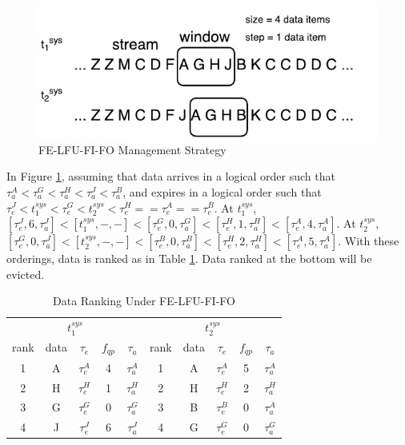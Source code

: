 \begin{figure}[!htbp]
	\centering
    \includegraphics[width=5in]{img/3-sifelfufifo.pdf}
    \caption{FE-LFU-FI-FO Management Strategy}
    \label{fig:3-sifelfufifo}
\end{figure}

In Figure \ref{fig:3-sifelfufifo}, assuming that data arrives in a logical order such that $\tau^{A}_{a} < \tau^{G}_{a} < \tau^{H}_{a} < \tau^{J}_{a} < \tau^{B}_{a}$, and expires in a logical order such that  $\tau^{J}_{e} < t^{sys}_{1} < \tau^{G}_{e} < t^{sys}_{2} < \tau^{H}_{e} == \tau^{A}_{e} == \tau^{B}_{e}$.
At $t^{sys}_{1}$, $[\tau^{J}_{e}, 6, \tau^{J}_{a}] < [t^{sys}_{1}, -, -] < [\tau^{G}_{e}, 0, \tau^{G}_{a}] < [\tau^{H}_{e}, 1, \tau^{H}_{a}] < [\tau^{A}_{e}, 4, \tau^{A}_{a}]$. 
At $t^{sys}_{2}$, $[\tau^{G}_{e}, 0, \tau^{J}_{a}] < [t^{sys}_{2}, -, -] < [\tau^{B}_{e}, 0, \tau^{B}_{a}] < [\tau^{H}_{e}, 2, \tau^{H}_{a}] < [\tau^{A}_{e}, 5, \tau^{A}_{a}]$. 
With these orderings, data is ranked as in Table \ref{tab:felfufifo}. 
Data ranked at the bottom will be evicted. 

\begin{table}[!htbp]
\centering
\caption{Data Ranking Under FE-LFU-FI-FO}
\label{tab:felfufifo}
\begin{tabular}{|c|c|c|c|c||c|c|c|c|c|}
\hline
\multicolumn{5}{|c||}{$t^{sys}_{1}$} & \multicolumn{5}{c|}{$t^{sys}_{2}$} \\ \hhline{|=====#=====|}
rank & data & $\tau_{e}$ & $f_{qp}$ & $\tau_{a}$ & rank & data & $\tau_{e}$ & $f_{qp}$ & $\tau_{a}$ \\ \hhline{|=|=|=|=|=#=|=|=|=|=|}
1 & A & $\tau^{A}_{e}$ & 4 & $\tau^{A}_{a}$ & 1 & A & $\tau^{A}_{e}$ & 5 & $\tau^{A}_{a}$ \\ \hline
2 & H & $\tau^{H}_{e}$ & 1 & $\tau^{H}_{a}$ & 2 & H & $\tau^{H}_{e}$ & 2 & $\tau^{H}_{a}$ \\ \hline
3 & G & $\tau^{G}_{e}$ & 0 & $\tau^{G}_{a}$ & 3 & B & $\tau^{B}_{e}$ & 0 & $\tau^{A}_{a}$ \\ \hline
4 & J & $\tau^{J}_{e}$ & 6 & $\tau^{J}_{a}$ & 4 & G & $\tau^{G}_{e}$ & 0 & $\tau^{G}_{a}$ \\ \hline
\end{tabular}
\end{table}

